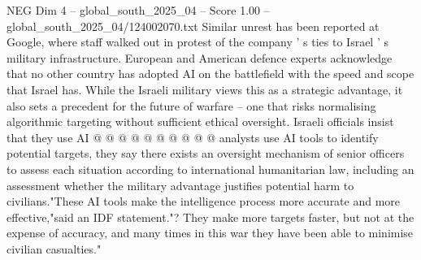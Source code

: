 \begin{textsample}{NEG Dim 4 – global\_south\_2025\_04 – Score 1.00 – global\_south\_2025\_04/124002070.txt}
Similar unrest has been reported at Google, where staff walked out in protest of the company ' s ties to Israel ' s military infrastructure.
European and American defence experts acknowledge that no other country has adopted AI on the battlefield with the speed and scope that Israel has.
While the Israeli military views this as a strategic advantage, it also sets a precedent for the future of warfare -- one that risks normalising algorithmic targeting without sufficient ethical oversight.
Israeli officials insist that they use AI @ @ @ @ @ @ @ @ @ @ analysts use AI tools to identify potential targets, they say there exists an oversight mechanism of senior officers to assess each situation according to international humanitarian law, including an assessment whether the military advantage justifies potential harm to civilians."These AI tools make the intelligence process more accurate and more effective,"said an IDF statement."?
They make more targets faster, but not at the expense of accuracy, and many times in this war they have been able to minimise civilian casualties."

\end{textsample}
